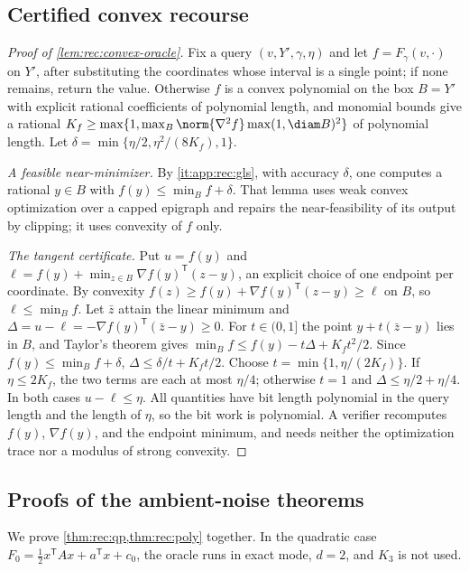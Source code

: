 \subsection{Certified convex recourse}\label{app:rec:convex}

\begin{proof}[Proof of \cref{lem:rec:convex-oracle}]
Fix a query $(v,Y',\gamma,\eta)$ and let $f=F_\gamma(v,\cdot)$ on $Y'$, after
substituting the coordinates whose interval is a single point; if none
remains, return the value. Otherwise $f$ is a convex polynomial on the box
$B=Y'$ with explicit rational coefficients of polynomial length, and monomial
bounds give a rational
$K_f\ge\max\{1,\max_B\norm{\nabla^2f}\max(1,\diam B)^2\}$ of polynomial
length. Let $\delta=\min\{\eta/2,\eta^2/(8K_f),1\}$.

\emph{A feasible near-minimizer.} By \ref{it:app:rec:gls}, with accuracy
$\delta$, one computes a rational $y\in B$ with $f(y)\le\min_Bf+\delta$. That
lemma uses weak convex optimization over a capped epigraph and repairs the
near-feasibility of its output by clipping; it uses convexity of $f$ only.

\emph{The tangent certificate.} Put $u=f(y)$ and
$\ell=f(y)+\min_{z\in B}\nabla f(y)^{\mathsf T}(z-y)$, an explicit choice of one
endpoint per coordinate. By convexity $f(z)\ge f(y)+\nabla f(y)^{\mathsf T}(z-y)
\ge\ell$ on $B$, so $\ell\le\min_Bf$. Let $\bar z$ attain the linear minimum
and $\Delta=u-\ell=-\nabla f(y)^{\mathsf T}(\bar z-y)\ge0$. For $t\in(0,1]$ the
point $y+t(\bar z-y)$ lies in $B$, and Taylor's theorem gives
$\min_Bf\le f(y)-t\Delta+K_ft^2/2$. Since $f(y)\le\min_Bf+\delta$,
$\Delta\le\delta/t+K_ft/2$. Choose $t=\min\{1,\eta/(2K_f)\}$. If
$\eta\le2K_f$, the two terms are each at most $\eta/4$; otherwise $t=1$ and
$\Delta\le\eta/2+\eta/4$. In both cases $u-\ell\le\eta$. All quantities have
bit length polynomial in the query length and the length of $\eta$, so the
bit work is polynomial. A verifier recomputes $f(y)$, $\nabla f(y)$, and the
endpoint minimum, and needs neither the optimization trace nor a modulus of
strong convexity.
\end{proof}

\subsection{Proofs of the ambient-noise theorems}\label{app:rec:main}

We prove \cref{thm:rec:qp,thm:rec:poly} together. In the quadratic case
$F_0=\frac12x^{\mathsf T}Ax+a^{\mathsf T}x+c_0$, the oracle runs in exact mode,
$d=2$, and $K_3$ is not used.

